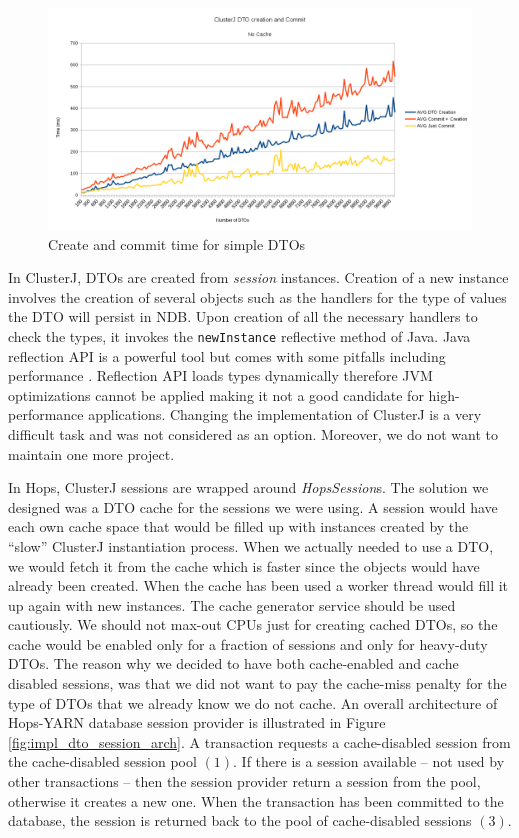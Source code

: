 \begin{figure}
\centering
\includegraphics[scale=0.55]{resources/images/Implementation/dto_create_commit_no_cache.png}
\caption{Create and commit time for simple DTOs}
\label{fig:impl_dto_no_cache}
\end{figure}

In ClusterJ, DTOs are created from \emph{session} instances. Creation
of a new instance involves the creation of several objects such as the
handlers for the type of values the DTO will persist in NDB. Upon creation
of all the necessary handlers to check the types, it invokes the
\texttt{newInstance} reflective method of Java. Java reflection API is
a powerful tool but comes with some pitfalls including
performance \cite{java_reflection}. Reflection API loads types dynamically therefore JVM
optimizations cannot be applied making it not a good candidate for
high-performance applications. Changing the implementation of ClusterJ
is a very difficult task and was not considered as an
option. Moreover, we do not want to maintain one more project.

In Hops, ClusterJ sessions are wrapped around \emph{HopsSession}s. The
solution we designed was a DTO cache for the sessions we were
using. A session would have each own cache space that would be filled
up with instances created by the ``slow'' ClusterJ instantiation
process. When we actually needed to use a DTO, we would fetch it from
the cache which is faster since the objects would have already been
created. When the cache has been used a worker thread would fill it up
again with new instances. The cache generator service should be used
cautiously. We should not max-out CPUs just for creating cached DTOs, so the
cache would be enabled only for a fraction of sessions and only for
heavy-duty DTOs. The reason why we decided to have both cache-enabled
and cache disabled sessions, was that we did not want to pay the
cache-miss penalty for the type of DTOs that we already know we do not
cache. An overall architecture of Hops-YARN database session provider
is illustrated in Figure \ref{fig:impl_dto_session_arch}. A
transaction requests a cache-disabled session from the cache-disabled
session pool $(1)$. If there is a session available -- not used by
other transactions -- then the session provider return a session from
the pool, otherwise it creates a new one. When the transaction has
been committed to the database, the session is returned back to the pool
of cache-disabled sessions $(3)$.

